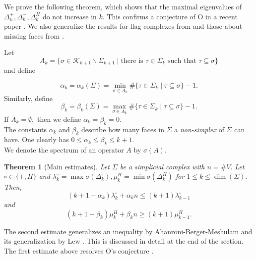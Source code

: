 \documentclass[10pt]{amsart}
\newtheorem{theorem}{Theorem}[section]
\theoremstyle{definition}
\newcommand{\K}{\mathcal{K}}
\begin{document}
We prove the following theorem, which shows that the maximal eigenvalues of $\Delta^+_k,\Delta_k^-,\Delta^H_k$ do not increase in $k.$ This confirms a conjecture of O in a recent paper \cite[Conjecture~1.1]{SO2}. We also generalize the results for flag complexes from \cite{AharoniBergerMeshulam} and those about missing faces from \cite{lewgaps}.



Let 
\[A_k = \lbrace\sigma\in \K_{k+1}\backslash\Sigma_{k+1}\mid\mbox{there is }\tau\in\Sigma_k \mbox{ such that }\tau\subseteq\sigma\rbrace\] and define

\[\alpha_k = \alpha_k(\Sigma) = \min_{\sigma\in A_k}\#\lbrace\tau\in\Sigma_k\mid\tau\subseteq\sigma\rbrace -1.\]
Similarly, define
\[\beta_k = \beta_k(\Sigma) = \max_{\sigma\in A_k}\#\lbrace\tau\in\Sigma_k\mid\tau\subseteq\sigma\rbrace -1.\]
If $A_k = \emptyset,$ then we define $\alpha_k = \beta_k = 0.$\\
The constants $\alpha_k$ and $\beta_k$ describe how many faces in $\Sigma$ a \textit{non-simplex} of $\Sigma$ can have.
One clearly has $0\leq\alpha_k\leq\beta_k\leq k+1.$\\
We denote the spectrum of an operator $A$ by $\sigma(A).$
\begin{theorem}[Main estimates]\label{main}
    Let $\Sigma$ be a simplicial complex with $n = \#V.$ Let $\circ\in\lbrace\pm,H\rbrace$ and $\lambda^\circ_k = \max\sigma(\Delta^\circ_k), \mu^H_k= \min\sigma(\Delta^H_k)$ for $1\leq k\leq\dim(\Sigma).$ Then,
    \[(k+1-\alpha_k)\lambda^\circ_k+\alpha_kn\leq(k+1)\lambda^\circ_{k-1}\]
    and 
    \[(k+1-\beta_k)\mu^H_k+\beta_kn\geq(k+1)\mu^H_{k-1}.\]
\end{theorem}


The second estimate generalizes an inequality by Ahanroni-Berger-Meshulam  \cite[Theorem~1.1]{AharoniBergerMeshulam} and its generalization by Lew \cite[Theorem~1.2]{lewgaps}. This is discussed in detail at the end of the section.\\
The first estimate above resolves O's conjecture \cite[Conjecture~1.1]{SO2}.
\end{document}
